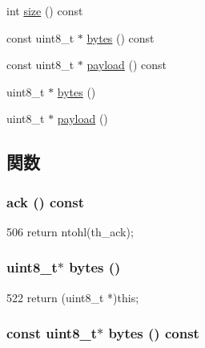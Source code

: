 \begin{DoxyCompactItemize}
\item 
int \hyperlink{structNet_1_1TcpHdr_ab8e4e3e2a7bf18888b71bdf9dda0770b}{size} () const 
\item 
const uint8\_\-t $\ast$ \hyperlink{structNet_1_1TcpHdr_aaa586eeaf354005403ca8e20f961b6c3}{bytes} () const 
\item 
const uint8\_\-t $\ast$ \hyperlink{structNet_1_1TcpHdr_a5f0d069ddb9d067af9e94963bd1fc7a2}{payload} () const 
\item 
uint8\_\-t $\ast$ \hyperlink{structNet_1_1TcpHdr_add4fb6fe45a091194dc9eac521194698}{bytes} ()
\item 
uint8\_\-t $\ast$ \hyperlink{structNet_1_1TcpHdr_a79ce21e3572e587b71de7af1ac640b6f}{payload} ()
\end{DoxyCompactItemize}


\subsection{関数}
\hypertarget{structNet_1_1TcpHdr_ac525b742fa49239d72c1a5b7171bbe69}{
\subsubsection[{ack}]{ ack () const}}
\label{structNet_1_1TcpHdr_ac525b742fa49239d72c1a5b7171bbe69}



\begin{DoxyCode}
506 { return ntohl(th_ack); }
\end{DoxyCode}
\hypertarget{structNet_1_1TcpHdr_add4fb6fe45a091194dc9eac521194698}{
\subsubsection[{bytes}]{\setlength{\rightskip}{0pt plus 5cm}uint8\_\-t$\ast$ bytes ()}}
\label{structNet_1_1TcpHdr_add4fb6fe45a091194dc9eac521194698}



\begin{DoxyCode}
522 { return (uint8_t *)this; }
\end{DoxyCode}
\hypertarget{structNet_1_1TcpHdr_aaa586eeaf354005403ca8e20f961b6c3}{
\subsubsection[{bytes}]{\setlength{\rightskip}{0pt plus 5cm}const uint8\_\-t$\ast$ bytes () const}}
\label{structNet_1_1TcpHdr_aaa586eeaf354005403ca8e20f961b6c3}



